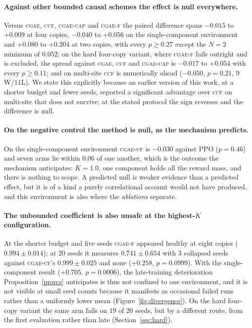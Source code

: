 \documentclass[review,authoryear,3p,times]{elsarticle}
\newcommand{\cgae}{\textsc{cgae}}              %
\newcommand{\cflow}{\textsc{cgae-cf}}          %
\newcommand{\cflowraw}{\textsc{cgae-f}}        %
\newcommand{\ccap}{\textsc{cgae-cap}}          %
\newcommand{\ccf}{\textsc{ccf}}
\begin{document}
\paragraph{Against other bounded causal schemes the effect is null everywhere.}
Versus \cgae{}, \ccf{}, \ccap{} and \cflowraw{} the paired difference spans
$-0.015$ to $+0.009$ at four copies, $-0.040$ to $+0.056$ on the
single-component environment and $+0.080$ to $+0.204$ at two copies, with every
$p\ge0.27$ except the $N{=}2$ minimum of $0.052$; on the hard four-copy
variant, where \cflowraw{} fails outright and is excluded, the spread against
\cgae, \ccf{} and \ccap{} is $-0.017$ to $+0.054$ with every $p\ge0.11$;
and on multi-site \ccf{} is numerically ahead ($-0.050$, $p=0.21$,
$9$W/$11$L). We state this explicitly because an earlier version of this work,
at a shorter budget and fewer seeds, reported a significant advantage over
\ccf{} on multi-site that does not survive; at the stated protocol the sign
reverses and the difference is null.

\paragraph{On the negative control the method is null, as the mechanism
predicts.} On the single-component environment \cflow{} is $-0.030$ against PPO
($p=0.46$) and seven arms lie within $0.06$ of one another, which is the outcome
the mechanism anticipates: $K=1.0$, one component holds all the reward mass, and
there is nothing to scope. A predicted null is weaker evidence than a predicted
effect, but it is of a kind a purely correlational account would not have
produced, and this environment is also where the \emph{ablations} separate.

\paragraph{The unbounded coefficient is also unsafe at the highest-$K$
configuration.} At the shorter budget and five seeds \cflowraw{} appeared
healthy at eight copies ($0.994\pm0.014$); at $20$ seeds it measures
$0.741\pm0.654$ with $3$ collapsed seeds against \cflow's $0.999\pm0.025$ and
none ($+0.258$, $p=0.0999$). With the single-component result ($+0.705$,
$p=0.0006$), the late-training deterioration Proposition~\ref{prop:s}
anticipates is thus not confined to one environment, and it is not visible at
small seed counts because it manifests as occasional failed runs rather than a
uniformly lower mean (Figure~\ref{fig:divergence}). On the hard four-copy
variant the same arm fails on $19$ of $20$ seeds, but by a different route,
from the first evaluation rather than late (Section~\ref{sec:hard}).
\end{document}
